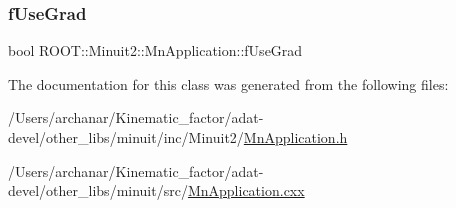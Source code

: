 \subsubsection{\texorpdfstring{fUseGrad}{fUseGrad}}
{\footnotesize\ttfamily bool R\+O\+O\+T\+::\+Minuit2\+::\+Mn\+Application\+::f\+Use\+Grad\hspace{0.3cm}{\ttfamily [protected]}}



The documentation for this class was generated from the following files\+:\begin{DoxyCompactItemize}
\item 
/\+Users/archanar/\+Kinematic\+\_\+factor/adat-\/devel/other\+\_\+libs/minuit/inc/\+Minuit2/\mbox{\hyperlink{adat-devel_2other__libs_2minuit_2inc_2Minuit2_2MnApplication_8h}{Mn\+Application.\+h}}\item 
/\+Users/archanar/\+Kinematic\+\_\+factor/adat-\/devel/other\+\_\+libs/minuit/src/\mbox{\hyperlink{adat-devel_2other__libs_2minuit_2src_2MnApplication_8cxx}{Mn\+Application.\+cxx}}\end{DoxyCompactItemize}
